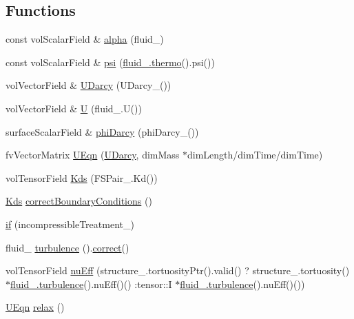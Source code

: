 \subsection*{Functions}
\begin{DoxyCompactItemize}
\item 
const vol\+Scalar\+Field \& \hyperlink{UEqn__1pl_8H_a7fe02434a19f3e00e927f32adcbb193b}{alpha} (fluid\+\_\+)
\item 
const vol\+Scalar\+Field \& \hyperlink{UEqn__1pl_8H_a165a34deec3ee505598e511a88831968}{psi} (\hyperlink{EEqns__2p_8H_a9d615e711281a88a96c648787c7dbd32}{fluid\+\_\+.\+thermo}().psi())
\item 
vol\+Vector\+Field \& \hyperlink{UEqn__1pl_8H_a128902f421bd168fd4996f177e0a59ad}{U\+Darcy} (U\+Darcy\+\_\+())
\item 
vol\+Vector\+Field \& \hyperlink{UEqn__1pl_8H_abe23fa3afe09cc511569a7dca4160561}{U} (fluid\+\_\+.\+U())
\item 
surface\+Scalar\+Field \& \hyperlink{UEqn__1pl_8H_a8d8b81e7b9e1aacc2219b33e188bbe8b}{phi\+Darcy} (phi\+Darcy\+\_\+())
\item 
fv\+Vector\+Matrix \hyperlink{UEqn__1pl_8H_afd1b8693a3c3032de396035e7045d467}{U\+Eqn} (\hyperlink{UEqn__1pl_8H_a128902f421bd168fd4996f177e0a59ad}{U\+Darcy}, dim\+Mass $\ast$dim\+Length/dim\+Time/dim\+Time)
\item 
vol\+Tensor\+Field \hyperlink{UEqn__1pl_8H_a62892add15b2471396e4cbe00bd27b51}{Kds} (F\+S\+Pair\+\_\+.\+Kd())
\item 
\hyperlink{UEqn__1pl_8H_a62892add15b2471396e4cbe00bd27b51}{Kds} \hyperlink{UEqn__1pl_8H_a078b8c8a3a350cebb373c75944675603}{correct\+Boundary\+Conditions} ()
\item 
\hyperlink{UEqn__1pl_8H_a37319901bc0705f6b6d30d30fdcdf333}{if} (incompressible\+Treatment\+\_\+)
\item 
fluid\+\_\+ \hyperlink{UEqn__1pl_8H_a090e87d22594c1a36b430fb29e0e2f47}{turbulence} ().\hyperlink{hEqn_8H_a3a2458f7f54158be848527a3fdedd5dd}{correct}()
\item 
vol\+Tensor\+Field \hyperlink{UEqn__1pl_8H_a45b99c6eed207f4b52ba0f4a48682586}{nu\+Eff} (structure\+\_\+.\+tortuosity\+Ptr().valid() ? structure\+\_\+.\+tortuosity() $\ast$\hyperlink{UEqns__2p_8H_a1769aacd25eec8e30f213b1c177e12d6}{fluid\+\_\+.\+turbulence}().nu\+Eff()() \+:tensor\+::I $\ast$\hyperlink{UEqns__2p_8H_a1769aacd25eec8e30f213b1c177e12d6}{fluid\+\_\+.\+turbulence}().nu\+Eff()())
\item 
\hyperlink{UEqn__1pl_8H_afd1b8693a3c3032de396035e7045d467}{U\+Eqn} \hyperlink{UEqn__1pl_8H_a9a717d2a556132c73a6bb389a9de48bf}{relax} ()

\end{DoxyCompactItemize}
